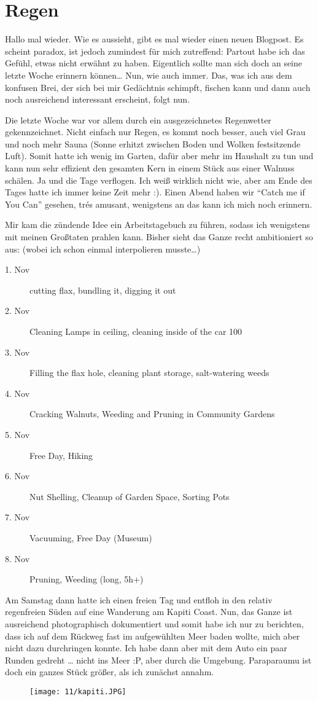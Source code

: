 \chapter{Regen}

Hallo mal wieder. Wie es aussieht, gibt es mal wieder einen neuen
Blogpost. Es scheint paradox, ist jedoch zumindest für mich zutreffend:
Partout habe ich das Gefühl, etwas nicht erwähnt zu haben. Eigentlich
sollte man sich doch an seine letzte Woche erinnern können\ldots{} Nun,
wie auch immer. Das, was ich aus dem konfusen Brei, der sich bei mir
Gedächtnis schimpft, fischen kann und dann auch noch ausreichend
interessant erscheint, folgt nun.

Die letzte Woche war vor allem durch ein ausgezeichnetes Regenwetter
gekennzeichnet. Nicht einfach nur Regen, es kommt noch besser, auch viel
Grau und noch mehr Sauna (Sonne erhitzt zwischen Boden und Wolken
festsitzende Luft). Somit hatte ich wenig im Garten, dafür aber mehr im
Haushalt zu tun und kann nun sehr effizient den gesamten Kern in einem
Stück aus einer Walnuss schälen. Ja und die Tage verflogen. Ich weiß
wirklich nicht wie, aber am Ende des Tages hatte ich immer keine Zeit
mehr :). Einen Abend haben wir ``Catch me if You Can'' gesehen, trés
amusant, wenigstens an das kann ich mich noch erinnern.

Mir kam die zündende Idee ein Arbeitstagebuch zu führen, sodass ich
wenigstens mit meinen Großtaten prahlen kann. Bisher sieht das Ganze
recht ambitioniert so aus: (wobei ich schon einmal interpolieren
musste\ldots)

\begin{description}
\item[1. Nov] cutting flax, bundling it, digging it out
\item[2. Nov] Cleaning Lamps in ceiling, cleaning inside of the car 100%
\item[3. Nov] Filling the flax hole, cleaning plant storage, salt-watering weeds
\item[4. Nov] Cracking Walnuts, Weeding and Pruning in Community Gardens
\item[5. Nov] Free Day, Hiking
\item[6. Nov] Nut Shelling, Cleanup of Garden Space, Sorting Pots
\item[7. Nov] Vacuuming, Free Day (Museum)
\item[8. Nov] Pruning, Weeding (long, 5h+)
\end{description}

Am Samstag dann hatte ich einen freien Tag und entfloh in den relativ
regenfreien Süden auf eine Wanderung am Kapiti Coast. Nun, das Ganze ist
ausreichend photographisch dokumentiert und somit habe ich nur zu
berichten, dass ich auf dem Rückweg fast im aufgewühlten Meer baden
wollte, mich aber nicht dazu durchringen konnte. Ich habe dann aber mit
dem Auto ein paar Runden gedreht \ldots{} nicht ins Meer :P, aber durch
die Umgebung. Paraparaumu ist doch ein ganzes Stück größer, als ich
zunächst annahm.
\begin{figure}[h]
  \centering
  \texttt{[image: 11/kapiti.JPG]}
\end{figure}

